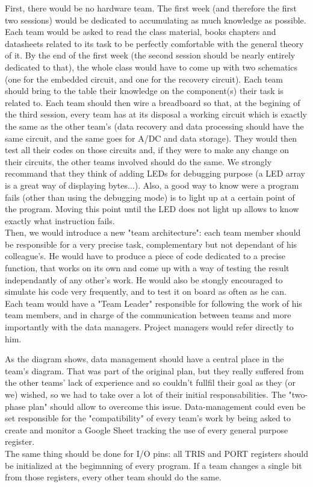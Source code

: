\documentclass[12pt]{article}
\begin{document}
	First, there would be no hardware team. The first week (and therefore the first two sessions) would be dedicated to accumulating as much knowledge as possible. Each team would be asked to read the class material, books chapters and datasheets related to its task to be perfectly comfortable with the general theory of it. By the end of the first week (the second session should be nearly entirely dedicated to that), the whole class would have to come up with two schematics (one for the embedded circuit, and one for the recovery circuit). Each team should bring to the table their knowledge on the component(s) their task is related to. Each team should then wire a breadboard so that, at the begining of the third session, every team has at its disposal a working circuit which is exactly the same as the other team's (data recovery and data processing should have the same circuit, and the same goes for A/DC and data storage). They would then test all their codes on those circuits and, if they were to make any change on their circuits, the other teams involved should do the same. We strongly recommand that they think of adding LEDs for debugging purpose (a LED array is a great way of displaying bytes...). Also, a good way to know were a program fails (other than using the debugging mode) is to light up at a certain point of the program. Moving this point until the LED does not light up allows to know exactly what instruction fails.\\

	Then, we would introduce a new "team architecture": each team member should be responsible for a very precise task, complementary but not dependant of his colleague's. He would have to produce a piece of code dedicated to a precise function, that works on its own and come up with a way of testing the result independantly of any other's work. He would also be stongly encouraged to simulate his code very frequently, and to test it on board as often as he can.\\
	Each team would have a "Team Leader" responsible for following the work of his team members, and in charge of the communication between teams and more importantly with the data managers. Project managers would refer directly to him.\\


	As the diagram shows, data management should have a central place in the team's diagram. That was part of the original plan, but they really suffered from the other teams' lack of experience and so couldn't fullfil their goal as they (or we) wished, so we had to take over a lot of their initial responsabilities. The "two-phase plan" should allow to overcome this issue. Data-management could even be set responsible for the "compatibility" of every team's work by being asked to create and monitor a Google Sheet tracking the use of every general purpose register.\\
	The same thing should be done for I/O pins: all TRIS and PORT registers should be initialized at the begimnning of every program. If a team changes a single bit from those registers, every other team should do the same.\\
\end{document}
